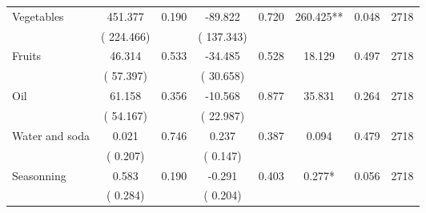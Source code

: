 \begin{tabular}{l*{7}{c}}
 Vegetables       &            451.377       &        0.190  &            -89.822       &        0.720  &            260.425**       &              0.048 &  2718 \\ 
                       &       (     224.466)             &                               &       (     137.343)                     &                               &                                               &                                &                      \\ 

 Fruits       &             46.314       &        0.533  &            -34.485       &        0.528  &             18.129       &              0.497 &  2718 \\ 
                       &       (      57.397)             &                               &       (      30.658)                     &                               &                                               &                                &                      \\ 

 Oil       &             61.158       &        0.356  &            -10.568       &        0.877  &             35.831       &              0.264 &  2718 \\ 
                       &       (      54.167)             &                               &       (      22.987)                     &                               &                                               &                                &                      \\ 

 Water and soda       &              0.021       &        0.746  &              0.237       &        0.387  &              0.094       &              0.479 &  2718 \\ 
                       &       (       0.207)             &                               &       (       0.147)                     &                               &                                               &                                &                      \\ 

 Seasonning       &              0.583       &        0.190  &             -0.291       &        0.403  &              0.277*       &              0.056 &  2718 \\ 
                       &       (       0.284)             &                               &       (       0.204)                     &                               &                                               &                                &                      \\ 


\end{tabular}
